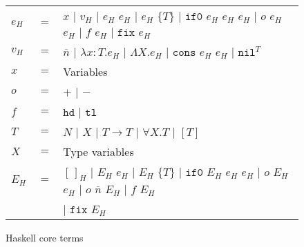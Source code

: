 \begin{figure}
\label{hct}
\caption{Haskell core terms}
\begin{center}
\begin{tabular}{lcl}
$e_{H}$ & $=$ & $x$ $\vert$ $v_{H}$ $\vert$ $e_{H}$ $e_{H}$ $\vert$ $e_{H}$ $\lbrace T\rbrace$ $\vert$ $\mathtt{if0}$ $e_{H}$ $e_{H}$ $e_{H}$ $\vert$ $o$ $e_{H}$ $e_{H}$ $\vert$ $f$ $e_{H}$ $\vert$ $\mathtt{fix}$ $e_{H}$ \\
$v_{H}$ & $=$ & $\overline{n}$ $\vert$ $\lambda x:T.e_{H}$ $\vert$ $\Lambda X.e_{H}$ $\vert$ $\mathtt{cons}$ $e_{H}$ $e_{H}$ $\vert$ $\mathtt{nil}^{T}$ \\
$x$ & $=$ & Variables \\
$o$ & $=$ & $\mathtt{+}$ $\vert$ $\mathtt{-}$ \\
$f$ & $=$ & $\mathtt{hd}$ $\vert$ $\mathtt{tl}$ \\
$T$ & $=$ & $N$ $\vert$ $X$ $\vert$ $T\rightarrow T$ $\vert$ $\forall X.T$ $\vert$ $[T]$ \\
$X$ & $=$ & Type variables \\
$E_{H}$ & $=$ & $[\,]_{H}$ $\vert$ $E_{H}$ $e_{H}$ $\vert$ $E_{H}$ $\lbrace T\rbrace$ $\vert$ $\mathtt{if0}$ $E_{H}$ $e_{H}$ $e_{H}$ $\vert$ $o$ $E_{H}$ $e_{H}$ $\vert$ $o$ $\overline{n}$ $E_{H}$ $\vert$ $f$ $E_{H}$ \\
&& $\vert$ $\mathtt{fix}$ $E_{H}$
\end{tabular}
\end{center}
\end{figure}